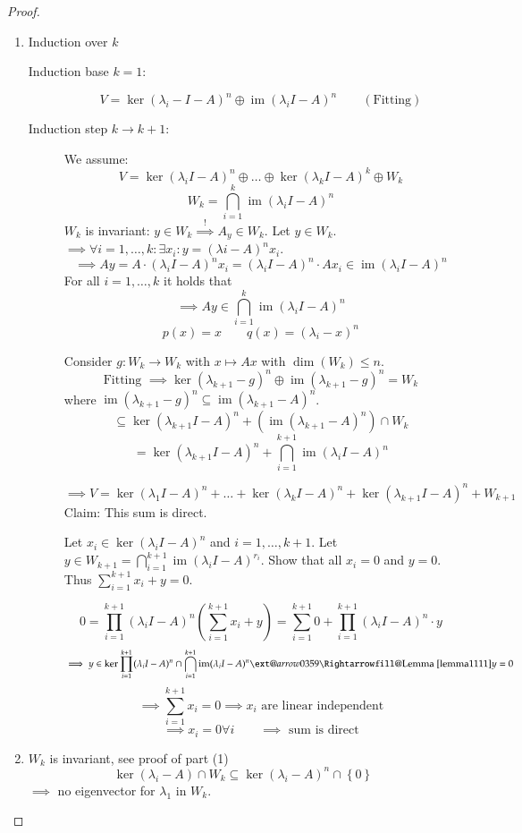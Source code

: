 \documentclass{article}
\makeatletter
\numberwithin{lecref}{section}
\newcommand{\set}[1]{\left\{#1\right\}}
\newcommand{\xRightarrow}[2][]{\ext@arrow 0359\Rightarrowfill@{#1}{#2}}
\DeclareMathOperator{\im}{im}
\makeatother
\begin{document}
\begin{proof}
  \begin{enumerate}
    \item Induction over $k$
      \begin{description}
        \item[Induction base $k=1$:] 
          \[ V = \ker(\lambda_i - I - A)^n \oplus \im(\lambda_i I - A)^n \qquad (\text{Fitting}) \]
        \item[Induction step $k \to k+1$:]
          We assume:
          \[ V = \ker(\lambda_i I - A)^n \oplus \dots \oplus \ker(\lambda_k I - A)^k \oplus W_k \]
          \[ W_k = \bigcap_{i=1}^k \im(\lambda_i I - A)^n \]
          $W_k$ is invariant: $y \in W_k \overset!\implies A_y \in W_k$.
          Let $y \in W_k$. $\implies \forall i = 1, \dots, k: \exists x_i: y = (\lambda i - A)^n x_i$.
          \[ \implies Ay = A \cdot (\lambda_i I - A)^n x_i = (\lambda_i I - A)^n \cdot Ax_i \in \im(\lambda_i I - A)^n \]
          For all $i = 1,\dots,k$ it holds that
          \[ \implies Ay \in \bigcap_{i=1}^k \im(\lambda_i I - A)^n \]
          \[ p(x) = x \qquad q(x) = (\lambda_i - x)^n \]

          Consider $g: W_k \to W_k$ with $x \mapsto Ax$ with $\dim(W_k) \leq n$.
          \[ \text{Fitting } \implies \ker(\lambda_{k+1} - g)^n \oplus \im(\lambda_{k+1} - g)^n = W_k \]
          where $\im(\lambda_{k+1} - g)^n \subseteq \im(\lambda_{k+1} - A)^n$.
          \[ \subseteq \ker(\lambda_{k+1} I - A)^n + (\im(\lambda_{k+1} - A)^n) \cap W_k \]
          \[ = \ker(\lambda_{k+1} I - A)^n + \bigcap_{i=1}^{k+1} \im(\lambda_i I - A)^n \]

          \[ \implies V = \ker(\lambda_1 I - A)^n + \dots + \ker(\lambda_k I - A)^n + \ker(\lambda_{k+1} I - A)^n + W_{k+1} \]
          Claim: This sum is direct.

          Let $x_i \in \ker(\lambda_i I - A)^n$ and $i=1,\dots,k+1$.
          Let $y \in W_{k+1} = \bigcap_{i=1}^{k+1} \im(\lambda_i I - A)^{r_i}$.
          Show that all $x_i = 0$ and $y = 0$. Thus $\sum_{i=1}^{k+1} x_i + y = 0$.

          \[ 0 = \prod_{i=1}^{k+1} (\lambda_i I - A)^n \left(\sum_{i=1}^{k+1} x_i + y\right) = \sum_{i=1}^{k+1} 0 + \prod_{i=1}^{k+1} (\lambda_i I - A)^n \cdot y \]
          \[ \implies y \in \ker{\prod_{i=1}^{k+1} (\lambda_i I - A)^n \cap \bigcap_{i=1}^{k+1} \im(\lambda_i I - A)^n} \xRightarrow{\text{Lemma~\ref{lemma1111}}} y = 0 \]
          \[ \implies \sum_{i=1}^{k+1} x_i = 0 \implies x_i \text{ are linear independent} \]
          \[ \implies x_i = 0 \forall i \qquad \implies \text{ sum is direct} \]
      \end{description}
    \item
      $W_k$ is invariant, see proof of part (1)
      \[ \ker(\lambda_i - A) \cap W_k \subseteq \ker(\lambda_i - A)^n \cap \set{0} \]
      $\implies$ no eigenvector for $\lambda_1$ in $W_k$.
  \end{enumerate}
\end{proof}
\end{document}
